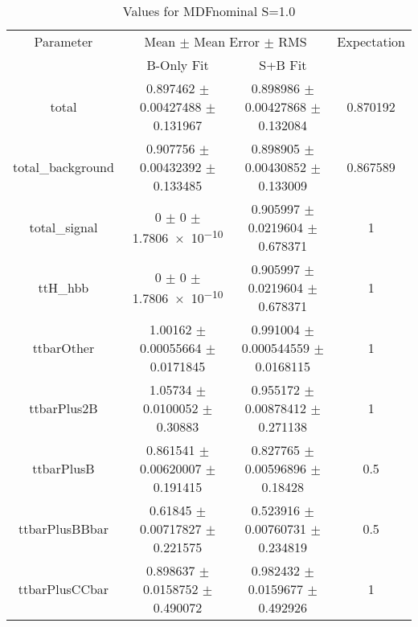 \begin{table}
\centering
\caption{Values for MDFnominal S=1.0}
\begin{tabular}{cccc}
\toprule
Parameter & \multicolumn{2}{c}{Mean $\pm$ Mean Error $\pm$ RMS} & Expectation\\
 & B-Only Fit & S+B Fit & \\
\midrule
total & \num{0.897462} $\pm$ \num{0.00427488} $\pm$ \num{0.131967} & \num{0.898986} $\pm$ \num{0.00427868} $\pm$ \num{0.132084} & \num{0.870192}\\
total\_background & \num{0.907756} $\pm$ \num{0.00432392} $\pm$ \num{0.133485} & \num{0.898905} $\pm$ \num{0.00430852} $\pm$ \num{0.133009} & \num{0.867589}\\
total\_signal & \num{0} $\pm$ \num{0} $\pm$ \num{1.7806e-10} & \num{0.905997} $\pm$ \num{0.0219604} $\pm$ \num{0.678371} & \num{1}\\
ttH\_hbb & \num{0} $\pm$ \num{0} $\pm$ \num{1.7806e-10} & \num{0.905997} $\pm$ \num{0.0219604} $\pm$ \num{0.678371} & \num{1}\\
ttbarOther & \num{1.00162} $\pm$ \num{0.00055664} $\pm$ \num{0.0171845} & \num{0.991004} $\pm$ \num{0.000544559} $\pm$ \num{0.0168115} & \num{1}\\
ttbarPlus2B & \num{1.05734} $\pm$ \num{0.0100052} $\pm$ \num{0.30883} & \num{0.955172} $\pm$ \num{0.00878412} $\pm$ \num{0.271138} & \num{1}\\
ttbarPlusB & \num{0.861541} $\pm$ \num{0.00620007} $\pm$ \num{0.191415} & \num{0.827765} $\pm$ \num{0.00596896} $\pm$ \num{0.18428} & \num{0.5}\\
ttbarPlusBBbar & \num{0.61845} $\pm$ \num{0.00717827} $\pm$ \num{0.221575} & \num{0.523916} $\pm$ \num{0.00760731} $\pm$ \num{0.234819} & \num{0.5}\\
ttbarPlusCCbar & \num{0.898637} $\pm$ \num{0.0158752} $\pm$ \num{0.490072} & \num{0.982432} $\pm$ \num{0.0159677} $\pm$ \num{0.492926} & \num{1}\\
\bottomrule
\end{tabular}
\end{table}